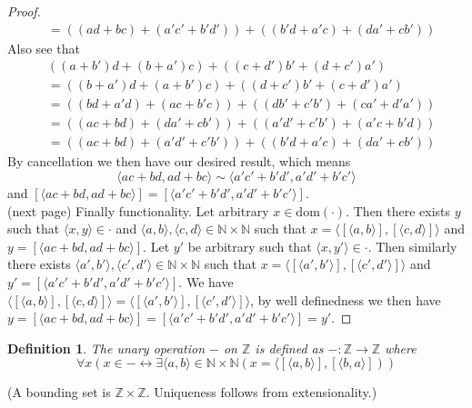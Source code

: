 \documentclass{report}
\newtheorem{definition}[theo]{Definition}
\begin{document}
\begin{proof}
\begin{align*}
&=((ad+bc)+(a'c'+b'd'))+((b'd+a'c)+(da'+cb'))
\end{align*}
Also see that
\begin{align*}
&((a+b')d+(b+a')c)+((c+d')b'+(d+c')a')\\
&=((b+a')d+(a+b')c)+((d+c')b'+(c+d')a')\\
&=((bd+a'd)+(ac+b'c))+((db'+c'b')+(ca'+d'a'))\\
&=((ac+bd)+(da'+cb'))+((a'd'+c'b')+(a'c+b'd))\\
&=((ac+bd)+(a'd'+c'b'))+((b'd+a'c)+(da'+cb'))
\end{align*}
By cancellation we then have our desired result, which means
\begin{equation*}
\langle ac+bd,ad+bc\rangle\sim\langle a'c'+b'd',a'd'+b'c'\rangle
\end{equation*}
and $[\langle ac+bd,ad+bc\rangle]=[\langle a'c'+b'd',a'd'+b'c'\rangle]$.\\
(next page)\newpage
\indent Finally functionality. Let arbitrary $x\in\text{dom}(\cdot)$. Then there exists $y$ such that $\langle x,y\rangle\in\cdot$ and 
$\langle a,b\rangle,\langle c,d\rangle\in\mathbb N\times\mathbb N$ such that 
$x=\langle[\langle a,b\rangle],[\langle c,d\rangle]\rangle$ and $y=[\langle ac+bd,ad+bc\rangle]$.
Let $y'$ be arbitrary such that $\langle x,y'\rangle\in\cdot$. Then similarly there exists
$\langle a',b'\rangle,\langle c',d'\rangle\in\mathbb N\times\mathbb N$ such that 
$x=\langle[\langle a',b'\rangle],[\langle c',d'\rangle]\rangle$ and $y'=[\langle a'c'+b'd',a'd'+b'c'\rangle]$.
We have $\langle[\langle a,b\rangle],[\langle c,d\rangle]\rangle=\langle[\langle a',b'\rangle],[\langle c',d'\rangle]\rangle$, by well definedness we then have
$y=[\langle ac+bd,ad+bc\rangle]=[\langle a'c'+b'd',a'd'+b'c'\rangle]=y'$.
\end{proof}
\begin{definition}
The unary operation $-$ on $\mathbb Z$ is defined as $-:\mathbb Z\to\mathbb Z$ where
\begin{equation*}
\forall x(x\in-\leftrightarrow\exists\langle a,b\rangle\in\mathbb N\times\mathbb N(x=\langle[\langle a,b\rangle],[\langle b,a\rangle]))
\end{equation*}
\end{definition}
\noindent (A bounding set is $\mathbb Z\times\mathbb Z$. Uniqueness follows from extensionality.)
\end{document}
